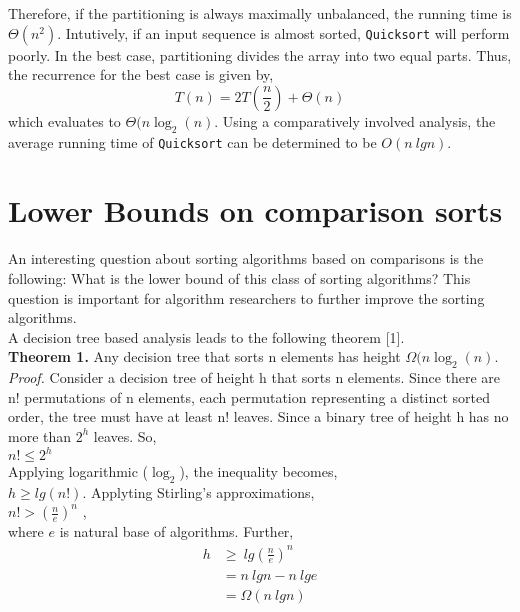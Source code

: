 \documentclass[a4paper, 15pt,twocolumn]{article}
\begin{document}
Therefore, if the partitioning is always maximally
unbalanced, the running time is $\Theta(n^2)$. Intutively,
if an input sequence is almost sorted, \texttt{Quicksort}
will perform poorly. In the best case, partitioning
divides the array into two equal parts. Thus, the
recurrence for the best case is given by,\\
\begin{equation*}
\textit{T}(n)=2\textit{T}\left(\frac{n}{2}\right)+\Theta(n)
\end{equation*}
which evaluates to $\Theta(n\log_2(n)$. Using a comparatively involved analysis, the average running time
of \texttt{Quicksort} can be determined to be $O(n\ lgn)$.
\section{Lower Bounds on comparison sorts}
An interesting question about sorting algorithms
based on comparisons is the following: What is
the lower bound of this class of sorting algorithms? This question is important for algorithm researchers to further improve the sorting algorithms.\\
A decision tree based analysis leads to the following \vspace{0.5pc} theorem [1].\\
\textbf{Theorem 1.} Any decision tree that sorts n elements has height \vspace{0.5pc}$\Omega(n\log_2(n)$.\\
\textit{Proof.} Consider a decision tree of height h that 
sorts n elements. Since there are n! permutations
of n elements, each permutation representing a distinct sorted order, the tree must have at least n! 
leaves. Since a binary tree of height h has no more
than $2^h$ leaves. So,\\
\vspace{0.5pc}$n!\leq 2^h$\\
Applying logarithmic ($\log_2$), the inequality becomes,\\
$h\geq lg(n!)$.\newline
Applyting Stirling's approximations,\\
$n!>\left(\frac{n}{e}\right)^n$ ,\\
where $e$ is natural base of algorithms. Further,
\indent
\begin{align*}
h&\geq\ lg\left(\frac{n}{e}\right)^n\\
&= n\ lgn -n\ lge\\
&= \Omega(n\ lgn)
\end{align*}
\end{document}
